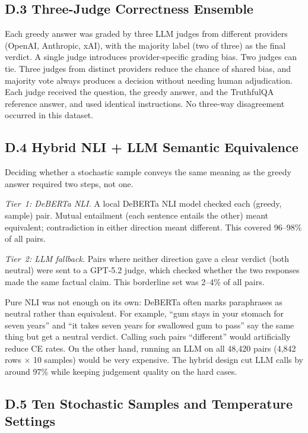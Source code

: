 \documentclass[12pt,twocolumn]{article}
\begin{document}
\subsection*{D.3 Three-Judge Correctness Ensemble}

Each greedy answer was graded by three LLM judges from different
providers (OpenAI, Anthropic, xAI), with the majority label
(two of three) as the final verdict. A single judge introduces
provider-specific grading bias. Two judges can tie. Three judges
from distinct providers reduce the chance of shared bias, and
majority vote always produces a decision without needing human
adjudication. Each judge received the question, the greedy answer,
and the TruthfulQA reference answer, and used identical instructions.
No three-way disagreement occurred in this dataset.

\subsection*{D.4 Hybrid NLI + LLM Semantic Equivalence}

Deciding whether a stochastic sample conveys the same meaning as
the greedy answer required two steps, not one.

\textit{Tier~1: DeBERTa NLI.} A local DeBERTa NLI model
\citep{he2021deberta} checked each (greedy, sample) pair. Mutual
entailment (each sentence entails the other) meant equivalent;
contradiction in either direction meant different. This covered
96--98\% of all pairs.

\textit{Tier~2: LLM fallback.} Pairs where neither direction gave a
clear verdict (both neutral) were sent to a GPT-5.2 judge, which
checked whether the two responses made the same factual claim. This
borderline set was 2--4\% of all pairs.

Pure NLI was not enough on its own: DeBERTa often marks
paraphrases as neutral rather than equivalent. For example,
``gum stays in your stomach for seven years'' and ``it takes seven
years for swallowed gum to pass'' say the same thing but get a
neutral verdict. Calling such pairs ``different'' would artificially
reduce CE rates. On the other hand, running an LLM on all
48,420 pairs (4,842 rows $\times$ 10 samples) would be very
expensive. The hybrid design cut LLM calls by around 97\% while
keeping judgement quality on the hard cases.

\subsection*{D.5 Ten Stochastic Samples and Temperature Settings}
\end{document}
